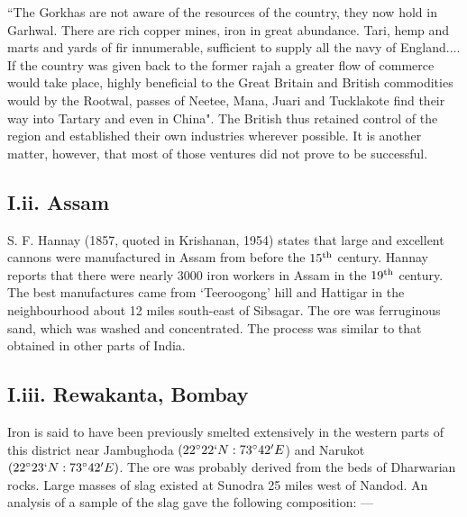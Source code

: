 \footnotesize{``The Gorkhas are not aware of the resources of the country, they now hold in Garhwal. There are rich copper mines, iron in great abundance. Tari, hemp and marts and yards of fir innumerable, sufficient to supply all the navy of England.... If the country was given back to the former rajah a greater flow of commerce would take place, highly beneficial to the Great Britain and British commodities would by the Rootwal, passes of Neetee, Mana, Juari and Tucklakote find their way into Tartary and even in China".} The British thus retained control of the region and established their own industries wherever possible. It is another matter, however, that most of those ventures did not prove to be successful.

\vspace{-.5cm}

\subsection*{I.ii. Assam}\label{subsection-2}

\vspace{-.3cm}

S. F. Hannay (1857, quoted in Krishanan, 1954) states that large and excellent cannons were manufactured in Assam from before the $15^{\rm th}$ century. Hannay reports that there were nearly 3000 iron workers in Assam in the $19^{\rm th}$ century. The best manufactures came from ‘Teeroogong’ hill and Hattigar in the neighbourhood about 12 miles south-east of Sibsagar. The ore was ferruginous sand, which was washed and concentrated. The process was similar to that obtained in other parts of India.

\vspace{-.3cm}

\subsection*{I.iii. Rewakanta, Bombay}\label{subsection-3}

\vspace{-.3cm}

Iron is said to have been previously smelted extensively in the western parts of this district near Jambughoda $(22^\circ 22`N: 73^\circ 42'E$) and Narukot $(22^\circ 23` N: 73^\circ 42' E)$. The ore was probably derived from the beds of Dharwarian rocks. Large masses of slag existed at Sunodra 25 miles west of Nandod. An analysis of a sample of the slag gave the following composition: —

